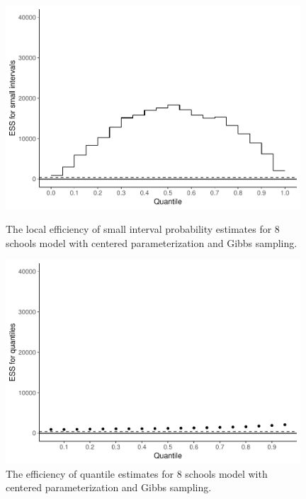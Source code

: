 \documentclass[american,]{article}
\theoremstyle{definition}
\begin{document}
\begin{figure}[tp]
  \centering
  \begin{minipage}{0.48\textwidth}
  \includegraphics[width=0.98\textwidth]{graphics/local-ess-jags-cp-tau-longer-1.pdf}
  \caption{The local efficiency of small interval probability estimates for 8 schools model with centered parameterization and Gibbs sampling.}
  \label{fig:local-ess-jags-cp-tau-longer-1}
\end{minipage}
\hfill
  \begin{minipage}{0.48\textwidth}
  \includegraphics[width=0.98\textwidth]{graphics/quantile-ess-jags-cp-tau-longer-1.pdf}
  \caption{The efficiency of quantile estimates for 8 schools model with centered parameterization and Gibbs sampling.}
  \label{fig:quantile-ess-jags-cp-tau-longer-1}
\end{minipage}
\end{figure}
\end{document}
